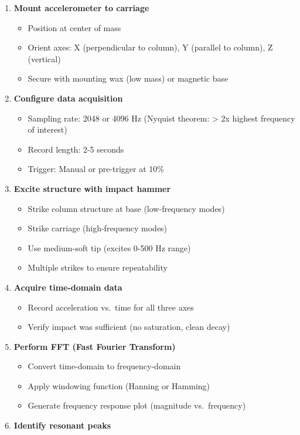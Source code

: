 \documentclass[
]{article}
\providecommand{\tightlist}{%
  \setlength{\itemsep}{0pt}\setlength{\parskip}{0pt}}
\begin{document}
\begin{enumerate}
\def\labelenumi{\arabic{enumi}.}
\item
  \textbf{Mount accelerometer to carriage}

  \begin{itemize}
  \tightlist
  \item
    Position at center of mass
  \item
    Orient axes: X (perpendicular to column), Y (parallel to column), Z
    (vertical)
  \item
    Secure with mounting wax (low mass) or magnetic base
  \end{itemize}
\item
  \textbf{Configure data acquisition}

  \begin{itemize}
  \tightlist
  \item
    Sampling rate: 2048 or 4096 Hz (Nyquist theorem: \textgreater{} 2x
    highest frequency of interest)
  \item
    Record length: 2-5 seconds
  \item
    Trigger: Manual or pre-trigger at 10\%
  \end{itemize}
\item
  \textbf{Excite structure with impact hammer}

  \begin{itemize}
  \tightlist
  \item
    Strike column structure at base (low-frequency modes)
  \item
    Strike carriage (high-frequency modes)
  \item
    Use medium-soft tip (excites 0-500 Hz range)
  \item
    Multiple strikes to ensure repeatability
  \end{itemize}
\item
  \textbf{Acquire time-domain data}

  \begin{itemize}
  \tightlist
  \item
    Record acceleration vs.~time for all three axes
  \item
    Verify impact was sufficient (no saturation, clean decay)
  \end{itemize}
\item
  \textbf{Perform FFT (Fast Fourier Transform)}

  \begin{itemize}
  \tightlist
  \item
    Convert time-domain to frequency-domain
  \item
    Apply windowing function (Hanning or Hamming)
  \item
    Generate frequency response plot (magnitude vs.~frequency)
  \end{itemize}
\item
  \textbf{Identify resonant peaks}


\end{enumerate}
\end{document}
